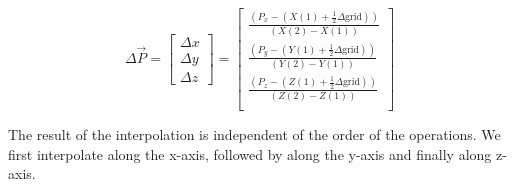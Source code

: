 \documentclass[]{article}
\begin{document}
%
%

\begin{equation}
	\label{eq: deltas interp}
	\Delta \vec{P} =
	\begin{bmatrix}
		\Delta x \\
		\Delta y \\
		\Delta z		
	\end{bmatrix}
	=
	\begin{bmatrix}
		 \frac{\left( P_x - \left( X(1) + \frac{1}{2} \Delta \mathrm{grid} \right)  \right)}{\left( X(2) - X(1) \right)} \\
		 \frac{\left( P_y - \left( Y(1) + \frac{1}{2} \Delta \mathrm{grid} \right)  \right)}{\left( Y(2) - Y(1) \right)} \\
		 \frac{\left( P_z - \left( Z(1) + \frac{1}{2} \Delta \mathrm{grid} \right)  \right)}{\left( Z(2) - Z(1) \right)} \\
 	\end{bmatrix}
\end{equation}

The result of the interpolation is independent of the order of the operations. We first interpolate along the x-axis, followed by along the y-axis and finally along z-axis.

\end{document}
